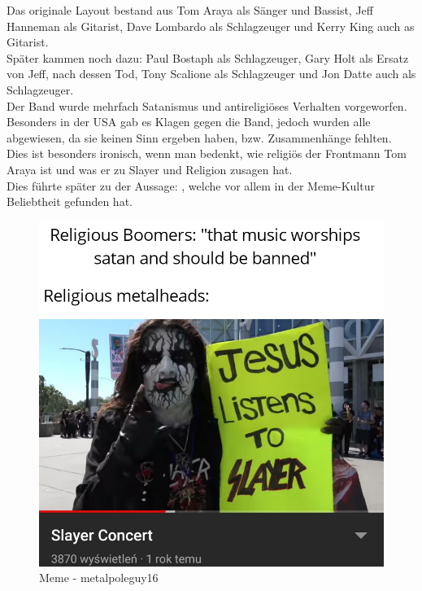 \documentclass[twocolumn,10pt]{article}
\begin{document}
			Das originale Layout bestand aus Tom Araya als Sänger und Bassist, Jeff Hanneman als Gitarist, Dave Lombardo als Schlagzeuger und Kerry King auch as Gitarist.\\
			Später kammen noch dazu: Paul Bostaph als Schlagzeuger, Gary Holt als Ersatz von Jeff, nach dessen Tod, Tony Scalione als Schlagzeuger und Jon Datte auch als Schlagzeuger. \cite{slayer.net}\\
			Der Band wurde mehrfach Satanismus und antireligiöses Verhalten vorgeworfen. Besonders in der USA gab es Klagen gegen die Band\cite{nme_2001}, jedoch wurden alle abgewiesen, da sie keinen Sinn ergeben haben, bzw. Zusammenhänge fehlten. Dies ist besonders ironisch, wenn man bedenkt, wie religiös der Frontmann Tom Araya ist und was er zu Slayer und Religion zusagen hat.\\
			Dies führte später zu der Aussage: , welche vor allem in der Meme-Kultur Beliebtheit gefunden hat.
			\begin{figure}[H]
				\includegraphics[width=\linewidth]{jesus}
				\caption{Meme - metalpoleguy16\cite{jesus}}
			\end{figure}
			\clearpage
\end{document}
